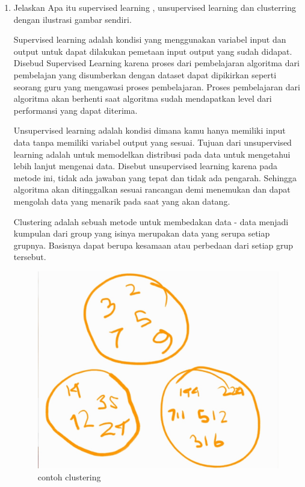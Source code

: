 \begin{enumerate}
\item Jelaskan Apa itu supervised learning , unsupervised learning dan clusterring dengan ilustrasi gambar sendiri.\par
Supervised learning adalah kondisi yang menggunakan variabel input dan output untuk dapat dilakukan pemetaan input output yang sudah didapat. Disebud Supervised Learning karena proses dari pembelajaran algoritma dari pembelajan yang disumberkan dengan dataset dapat dipikirkan seperti seorang guru yang mengawasi proses pembelajaran. Proses pembelajaran dari algoritma akan berhenti saat algoritma sudah mendapatkan level dari performansi yang dapat diterima. \par
Unsupervised learning adalah kondisi dimana kamu hanya memiliki input data tanpa memiliki variabel output yang sesuai. Tujuan dari unsupervised learning adalah untuk memodelkan distribusi pada data untuk mengetahui lebih lanjut mengenai data. Disebut unsupervised learning karena pada metode ini, tidak ada jawaban yang tepat dan tidak ada pengarah. Sehingga algoritma akan ditinggalkan sesuai rancangan demi menemukan dan dapat mengolah data yang menarik pada saat yang akan datang. \par
Clustering adalah sebuah metode untuk membedakan data - data menjadi kumpulan dari group yang isinya merupakan data yang serupa setiap grupnya. Basisnya dapat berupa kesamaan atau perbedaan dari setiap grup tersebut. \par
\begin{figure}[H]
\centering
\includegraphics[scale=0.2]{figures/1174035/chapter2/clustering.jpeg}
\caption{contoh clustering}
\label{contoh}
\end{figure}



\end{enumerate}
